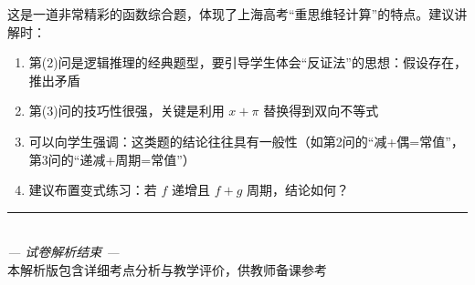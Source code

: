 \documentclass[10pt]{article}
\begin{document}
\begin{tipbox}[教学提示]
这是一道非常精彩的函数综合题，体现了上海高考``重思维轻计算''的特点。建议讲解时：
\begin{enumerate}
\item 第(2)问是逻辑推理的经典题型，要引导学生体会``反证法''的思想：假设存在，推出矛盾
\item 第(3)问的技巧性很强，关键是利用 \(x+\pi\) 替换得到双向不等式
\item 可以向学生强调：这类题的结论往往具有一般性（如第2问的``减+偶=常值''，第3问的``递减+周期=常值''）
\item 建议布置变式练习：若 \(f\) 递增且 \(f+g\) 周期，结论如何？
\end{enumerate}
\end{tipbox}

\vfill
\begin{center}
\rule{0.5\textwidth}{0.4pt}\\[0.5em]
\textit{— 试卷解析结束 —}\\[0.3em]
\small 本解析版包含详细考点分析与教学评价，供教师备课参考
\end{center}
\end{document}
